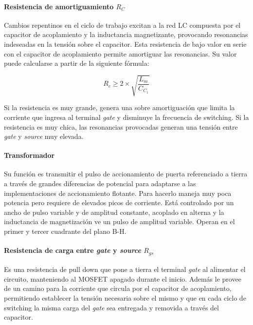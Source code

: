 
\paragraph{Resistencia de amortiguamiento $R_C$}

Cambios repentinos en el ciclo de trabajo excitan a la red LC compuesta por el capacitor de acoplamiento 
y la inductancia magnetizante, provocando resonancias indeseadas en la tensión sobre el capacitor. 
Esta resistencia de bajo valor en serie con el capacitor de acoplamiento permite amortiguar las resonancias. 
Su valor puede calcularse a partir de la siguiente fórmula:

$$ R_c\geq2\times\sqrt{\frac{L_m}{C_{C_1}}} $$

Si la resistencia es muy grande, genera una sobre amortiguación que limita la corriente que ingresa al terminal \textit{gate} y disminuye la frecuencia de switching. 
Si la resistencia es muy chica, las resonancias provocadas generan una tensión entre \textit{gate} y \textit{source} muy elevada.

\paragraph{Transformador}

Su función es transmitir el pulso de accionamiento de puerta referenciado a tierra a través de grandes diferencias de potencial para adaptarse a las implementaciones de accionamiento flotante. 
Para hacerlo maneja muy poca potencia pero requiere de elevados picos de corriente. 
Está controlado por un ancho de pulso variable y de amplitud constante,
acoplado en alterna y la inductancia de magnetización ve un pulso de amplitud variable.
Operan en el primer y tercer cuadrante del plano B-H.

\paragraph{Resistencia de carga entre \textit{gate} y \textit{source} $R_{gs}$}

Es una resistencia de pull down que pone a tierra el terminal \textit{gate} al alimentar el circuito, manteniendo al MOSFET apagado durante el inicio. 
Además le provee de un camino para la corriente que circula por el capacitor de acoplamiento, 
permitiendo establecer la tensión necesaria sobre el mismo y que en cada ciclo de switching 
la misma carga del \textit{gate} sea entregada y removida a través del capacitor. 

